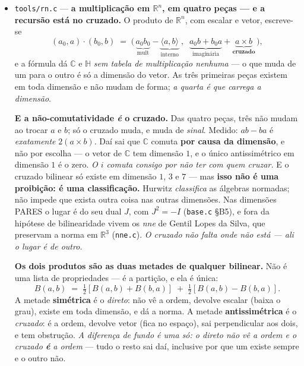 \documentclass[11pt]{article}
\newcommand{\code}[1]{\texttt{\small #1}}
\newcommand{\R}{\mathbb R}
\newcommand{\C}{\mathbb C}
\newcommand{\Hq}{\mathbb H}
\theoremstyle{plain}
\theoremstyle{remark}
\begin{document}
\begin{itemize}
\item \code{tools/rn.c} --- \textbf{a multiplicação em $\R^n$, em quatro peças --- e a recursão
está no cruzado.} O produto de $\R^n$, com escalar e vetor, escreve-se
\[
 (a_0,a)\cdot(b_0,b) \;=\; \bigl(\,\underbrace{a_0b_0}_{\text{mult}}-\underbrace{\langle a,b\rangle}
 _{\text{interno}}\;,\;\; \underbrace{a_0b+b_0a}_{\text{imaginária}}+\underbrace{a\times b}
 _{\textbf{cruzado}}\,\bigr),
\]
e a fórmula dá $\C$ e $\Hq$ \emph{sem tabela de multiplicação nenhuma} --- o que muda de um para o
outro é só a dimensão do vetor. As três primeiras peças existem em toda dimensão e não mudam de
forma; \emph{a quarta é que carrega a dimensão}.

\textbf{E a não-comutatividade \emph{é} o cruzado.} Das quatro peças, três não mudam ao trocar $a$
e $b$; só o cruzado muda, e muda de \emph{sinal}. Medido: $ab-ba$ é \emph{exatamente} $2(a\times b)$.
Daí sai que $\C$ comuta \textbf{por causa da dimensão}, e não por escolha --- o vetor de $\C$ tem
dimensão $1$, e o único antissimétrico em dimensão $1$ é o zero. \emph{O $i$ comuta consigo por não
ter com quem cruzar.} E o cruzado bilinear só existe em dimensão $1$, $3$ e $7$ --- mas
\textbf{isso não é uma proibição: é uma classificação.} Hurwitz \emph{classifica} as álgebras
normadas; não impede que exista outra coisa nas outras dimensões. Nas dimensões PARES o lugar é do
seu dual $J$, com $J^2=-I$ (\code{base.c} §B5), e fora da hipótese de bilinearidade vivem os
\emph{nne} de Gentil Lopes da Silva, que preservam a norma em $\R^3$ (\code{nne.c}). \emph{O
cruzado não falta onde não está --- ali o lugar é de outro.}

\textbf{Os dois produtos são as duas metades de qualquer bilinear.} Não é uma lista de propriedades
--- é a partição, e ela é única:
\[
 B(a,b) \;=\; \tfrac12[B(a,b)+B(b,a)] \;+\; \tfrac12[B(a,b)-B(b,a)].
\]
A metade \textbf{simétrica} é o \emph{direto}: não vê a ordem, devolve escalar (baixa o grau),
existe em toda dimensão, e dá a norma. A metade \textbf{antissimétrica} é o \emph{cruzado}: é a
ordem, devolve vetor (fica no espaço), sai perpendicular aos dois, e tem obstrução. \emph{A
diferença de fundo é uma só: o direto não vê a ordem e o cruzado \textbf{é} a ordem} --- tudo o
resto sai daí, inclusive por que um existe sempre e o outro não.


\end{itemize}
\end{document}
